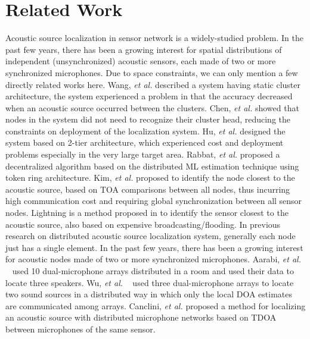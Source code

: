 \section{Related Work}

Acoustic source localization in sensor network is a widely-studied problem. 
In the past few years, there has been a growing interest for spatial distributions of independent (unsynchronized) acoustic sensors, each made of two or more synchronized microphones. Due to space constraints, we can only mention a few directly related works here.
Wang, \emph{et al.} \cite{wang2003acoustic} described a system having static cluster architecture, the system experienced a problem in that the accuracy decreased when an acoustic source occurred between the clusters.
Chen, \emph{et al.} \cite{chen2004dynamic} showed that nodes in the system did not need to recognize their cluster head, reducing the constraints on deployment of the localization system.
Hu, \emph{et al.} \cite{hu2009design} designed the system based on 2-tier architecture, which experienced cost and deployment problems especially in the very large target area.
Rabbat, \emph{et al.} \cite{rabbat2005robust} proposed a decentralized algorithm based on the distributed ML estimation technique using token ring architecture.
Kim, \emph{et al.} \cite{kim2009locating} proposed to identify the node closest to the acoustic source, based on TOA comparisons between all nodes, thus incurring high communication cost and requiring global synchronization between all sensor nodes.
Lightning is a method proposed in \cite{wang2008lightning} to identify the sensor closest to the acoustic source, also based on expensive broadcasting/flooding.
In previous research on distributed acoustic source localization system, generally each node just has a single element. 
In the past few years, there has been a growing interest for acoustic nodes made of two or more synchronized microphones. 
Aarabi, \emph{et al.} ~\cite{aarabi1900fusion} used 10 dual-microphone arrays distributed in a room and used their data to locate three speakers.
Wu, \emph{et al.} ~\cite{wu2012fusion} used three dual-microphone arrays to locate two sound sources in a distributed way in which only the local DOA estimates are communicated among arrays.
Canclini, \emph{et al.}\cite{canclini2013acoustic,Canclini2015} proposed a method for localizing an acoustic source with distributed microphone networks based on TDOA between microphones of the same sensor.

